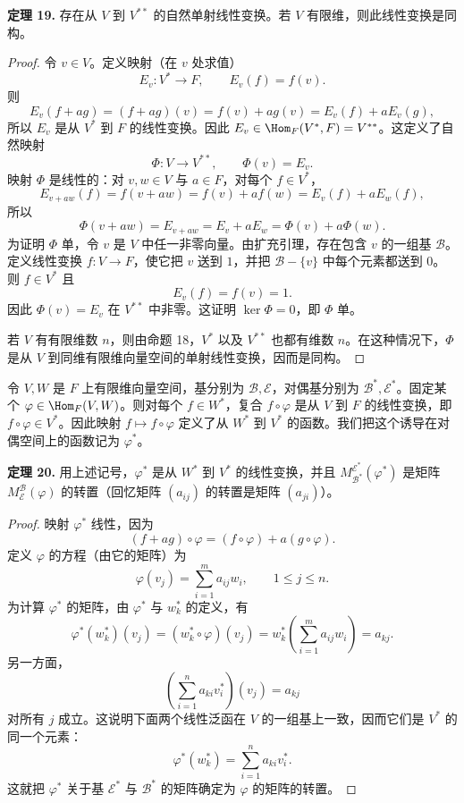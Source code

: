 \noindent\textbf{定理 19.} 存在从 $V$ 到 $V^{**}$ 的自然单射线性变换。若 $V$ 有限维，则此线性变换是同构。

\begin{proof}
令 $v\in V$。定义映射（在 $v$ 处求值）
\[
E_v:V^*\to F,
\qquad
E_v(f)=f(v).
\]
则
\[
E_v(f+ag)=(f+ag)(v)=f(v)+ag(v)=E_v(f)+aE_v(g),
\]
所以 $E_v$ 是从 $V^*$ 到 $F$ 的线性变换。因此 $E_v\in\Hom_F(V^*,F)=V^{**}$。这定义了自然映射
\[
\Phi:V\to V^{**},
\qquad
\Phi(v)=E_v.
\]
映射 $\Phi$ 是线性的：对 $v,w\in V$ 与 $a\in F$，对每个 $f\in V^*$，
\[
E_{v+aw}(f)=f(v+aw)=f(v)+af(w)=E_v(f)+aE_w(f),
\]
所以
\[
\Phi(v+aw)=E_{v+aw}=E_v+aE_w=\Phi(v)+a\Phi(w).
\]
为证明 $\Phi$ 单，令 $v$ 是 $V$ 中任一非零向量。由扩充引理，存在包含 $v$ 的一组基 $\mathcal B$。定义线性变换 $f:V\to F$，使它把 $v$ 送到 $1$，并把 $\mathcal B-\{v\}$ 中每个元素都送到 $0$。则 $f\in V^*$ 且
\[
E_v(f)=f(v)=1.
\]
因此 $\Phi(v)=E_v$ 在 $V^{**}$ 中非零。这证明 $\ker\Phi=0$，即 $\Phi$ 单。

若 $V$ 有有限维数 $n$，则由命题 18，$V^*$ 以及 $V^{**}$ 也都有维数 $n$。在这种情况下，$\Phi$ 是从 $V$ 到同维有限维向量空间的单射线性变换，因而是同构。
\end{proof}

令 $V,W$ 是 $F$ 上有限维向量空间，基分别为 $\mathcal B,\mathcal E$，对偶基分别为 $\mathcal B^*,\mathcal E^*$。固定某个 $\varphi\in\Hom_F(V,W)$。则对每个 $f\in W^*$，复合 $f\circ\varphi$ 是从 $V$ 到 $F$ 的线性变换，即 $f\circ\varphi\in V^*$。因此映射 $f\mapsto f\circ\varphi$ 定义了从 $W^*$ 到 $V^*$ 的函数。我们把这个诱导在对偶空间上的函数记为 $\varphi^*$。

\noindent\textbf{定理 20.} 用上述记号，$\varphi^*$ 是从 $W^*$ 到 $V^*$ 的线性变换，并且 $M_{\mathcal B^*}^{\mathcal E^*}(\varphi^*)$ 是矩阵 $M_{\mathcal E}^{\mathcal B}(\varphi)$ 的转置（回忆矩阵 $(a_{ij})$ 的转置是矩阵 $(a_{ji})$）。

\begin{proof}
映射 $\varphi^*$ 线性，因为
\[
(f+ag)\circ\varphi=(f\circ\varphi)+a(g\circ\varphi).
\]
定义 $\varphi$ 的方程（由它的矩阵）为
\[
\varphi(v_j)=\sum_{i=1}^m a_{ij}w_i,
\qquad 1\leq j\leq n.
\]
为计算 $\varphi^*$ 的矩阵，由 $\varphi^*$ 与 $w_k^*$ 的定义，有
\[
\varphi^*(w_k^*)(v_j)
=(w_k^*\circ\varphi)(v_j)
=w_k^*\left(\sum_{i=1}^m a_{ij}w_i\right)
=a_{kj}.
\]
另一方面，
\[
\left(\sum_{i=1}^n a_{ki}v_i^*\right)(v_j)=a_{kj}
\]
对所有 $j$ 成立。这说明下面两个线性泛函在 $V$ 的一组基上一致，因而它们是 $V^*$ 的同一个元素：
\[
\varphi^*(w_k^*)=\sum_{i=1}^n a_{ki}v_i^*.
\]
这就把 $\varphi^*$ 关于基 $\mathcal E^*$ 与 $\mathcal B^*$ 的矩阵确定为 $\varphi$ 的矩阵的转置。
\end{proof}

